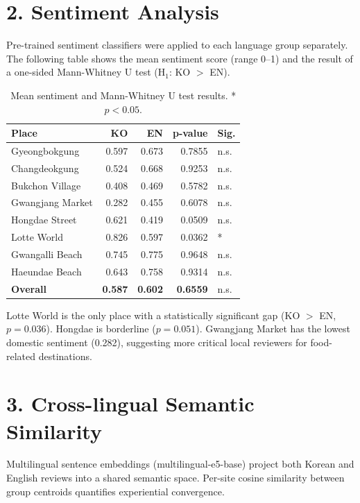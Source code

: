 \documentclass[11pt,a4paper]{article}
\begin{document}
\section*{2. Sentiment Analysis}

Pre-trained sentiment classifiers were applied to each language group separately.
The following table shows the mean sentiment score (range 0--1) and the
result of a one-sided Mann-Whitney U test (H$_1$: KO $>$ EN).

\begin{table}[H]
\centering
\small
\begin{tabular}{lRRRl}
\toprule
\textbf{Place} & \textbf{KO} & \textbf{EN} & \textbf{p-value} & \textbf{Sig.} \\
\midrule
Gyeongbokgung    & 0.597 & 0.673 & 0.7855 & n.s. \\
Changdeokgung    & 0.524 & 0.668 & 0.9253 & n.s. \\
Bukchon Village  & 0.408 & 0.469 & 0.5782 & n.s. \\
Gwangjang Market & 0.282 & 0.455 & 0.6078 & n.s. \\
Hongdae Street   & 0.621 & 0.419 & 0.0509 & n.s. \\
Lotte World      & 0.826 & 0.597 & 0.0362 & * \\
Gwangalli Beach  & 0.745 & 0.775 & 0.9648 & n.s. \\
Haeundae Beach   & 0.643 & 0.758 & 0.9314 & n.s. \\
\midrule
\textbf{Overall} & \textbf{0.587} & \textbf{0.602} & \textbf{0.6559} & n.s. \\
\bottomrule
\end{tabular}
\caption{Mean sentiment and Mann-Whitney U test results. * $p < 0.05$.}
\end{table}

Lotte World is the only place with a statistically significant gap
(KO $>$ EN, $p = 0.036$). Hongdae is borderline ($p = 0.051$).
Gwangjang Market has the lowest domestic sentiment (0.282),
suggesting more critical local reviewers for food-related destinations.

\section*{3. Cross-lingual Semantic Similarity}

Multilingual sentence embeddings (multilingual-e5-base) project both
Korean and English reviews into a shared semantic space. Per-site cosine
similarity between group centroids quantifies experiential convergence.
\end{document}

